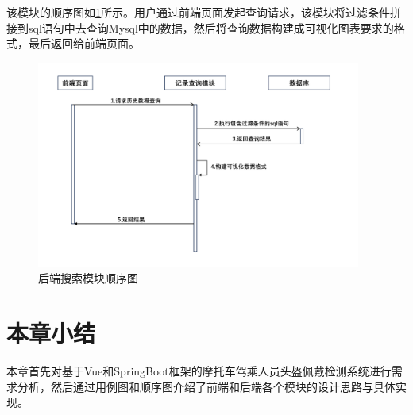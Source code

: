 该模块的顺序图如\ref{fig:seq4}所示。用户通过前端页面发起查询请求，该模块将过滤条件拼接到sql语句中去查询Mysql中的数据，然后将查询数据构建成可视化图表要求的格式，最后返回给前端页面。

\begin{figure}[!htb]
    \centering
    \includegraphics[width=0.95\textwidth]{figs/chap05/seq4.png}
    \caption{后端搜索模块顺序图}
    \label{fig:seq4}
\end{figure}



\section{本章小结}
本章首先对基于Vue和SpringBoot框架的摩托车驾乘人员头盔佩戴检测系统进行需求分析，然后通过用例图和顺序图介绍了前端和后端各个模块的设计思路与具体实现。


